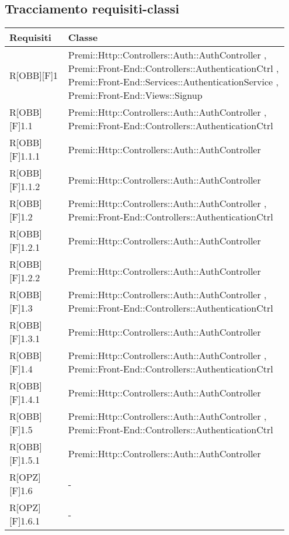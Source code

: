 \subsection{Tracciamento requisiti-classi}
\begin{table}[h]
	\begin{center}
		\begin{tabular}{|p{0.2\linewidth}|p{0.75\linewidth}|}
			\toprule
			\textbf{Requisiti} & \textbf{Classe}\\
		\midrule
			R[OBB][F]1 & Premi::Http::Controllers::Auth::AuthController , Premi::Front-End::Controllers::AuthenticationCtrl , Premi::Front-End::Services::AuthenticationService , Premi::Front-End::Views::Signup\\
		\midrule
			R[OBB][F]1.1 & Premi::Http::Controllers::Auth::AuthController , Premi::Front-End::Controllers::AuthenticationCtrl\\
		\midrule
			R[OBB][F]1.1.1 & Premi::Http::Controllers::Auth::AuthController\\
		\midrule
			R[OBB][F]1.1.2 & Premi::Http::Controllers::Auth::AuthController\\
		\midrule
			R[OBB][F]1.2 & Premi::Http::Controllers::Auth::AuthController , Premi::Front-End::Controllers::AuthenticationCtrl\\
		\midrule
			R[OBB][F]1.2.1 & Premi::Http::Controllers::Auth::AuthController\\
		\midrule
			R[OBB][F]1.2.2 & Premi::Http::Controllers::Auth::AuthController\\
		\midrule
			R[OBB][F]1.3 & Premi::Http::Controllers::Auth::AuthController , Premi::Front-End::Controllers::AuthenticationCtrl\\
		\midrule
			R[OBB][F]1.3.1 & Premi::Http::Controllers::Auth::AuthController\\
		\midrule
			R[OBB][F]1.4 & Premi::Http::Controllers::Auth::AuthController , Premi::Front-End::Controllers::AuthenticationCtrl\\
		\midrule
			R[OBB][F]1.4.1 & Premi::Http::Controllers::Auth::AuthController\\
		\midrule
			R[OBB][F]1.5 & Premi::Http::Controllers::Auth::AuthController , Premi::Front-End::Controllers::AuthenticationCtrl\\
		\midrule
			R[OBB][F]1.5.1 & Premi::Http::Controllers::Auth::AuthController\\
		\midrule
			R[OPZ][F]1.6 & -\\
		\midrule
			R[OPZ][F]1.6.1 & -\\
		\midrule

\end{tabular}
\end{center}
\end{table}

